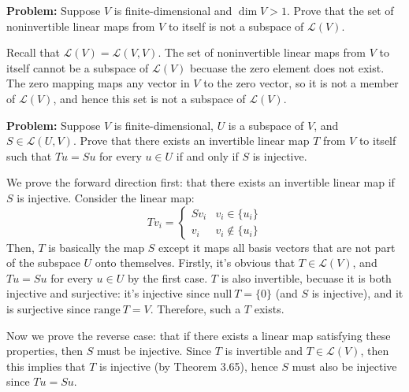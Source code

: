\documentclass[10pt]{article}
\newcommand{\range}{\mathrm{range \ }}
\renewcommand{\null}{\mathrm{null \ }}
\newenvironment{problem}{\textbf{Problem:}}{}
\begin{document}
	\begin{problem}
		Suppose \( V \) is finite-dimensional and \( \dim V > 1 \). Prove that the set of noninvertible linear maps 
		from \( V \) to itself is not a subspace of \( \mathcal L(V) \).
	\end{problem}

	\begin{solution}
		Recall that \( \mathcal L(V) = \mathcal L(V, V)\). The set of noninvertible linear maps from \( V \) to 
		itself cannot be a subspace of \( \mathcal L(V) \) becuase the zero element does not exist. The zero 
		mapping maps any vector in \( V \) to the zero vector, so it is not a member of \( \mathcal L(V) \), and 
		hence this set is not a subspace of \( \mathcal L(V) \). 

	\end{solution}

	\begin{problem}
		Suppose \( V \) is finite-dimensional, \( U \) is a subspace of \( V \), and \( S \in \mathcal L(U, V) \).
		Prove that there exists an invertible linear map \( T \) from \( V \) to itself such that \( Tu = Su \) 
		for every \( u \in U \) if and only if \( S \) is injective. 
	\end{problem}

	\begin{solution}
		We prove the forward direction first: that there exists an invertible linear map if \( S \) is 
		injective. Consider the linear map:
		\[
		Tv_i = \begin{cases}
			Sv_i & v_i \in \{u_i\} \\
			v_i & v_i \not \in \{u_i\} 
		\end{cases}
		\]
		Then, \( T \) is basically the map \( S \) except it maps all basis vectors that are not part of the 
		subspace \( U \) onto themselves. Firstly, it's obvious that \( T \in \mathcal L(V)\), and \( Tu = Su \) 
		for every \( u \in U \) by the first case. \( T \) is also invertible, becuase it is both injective
		and surjective: it's injective since \( \null T = \{0\}  \) (and \( S \) is 
		injective), and it is surjective since \( \range T = V \). Therefore, such a  \( T \) exists. 

		Now we prove the reverse case: that if there exists a linear map satisfying these properties, then
		\( S \) must be injective. Since \( T \) is invertible and  \( T \in \mathcal L(V) \), then this 
		implies that \( T \) is injective (by Theorem 3.65), hence \( S \) must also be 
		injective since \( Tu = Su \). 
	\end{solution}
\end{document}
